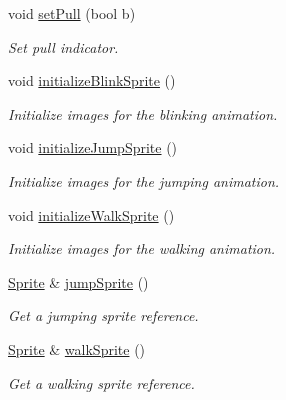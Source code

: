 \begin{DoxyCompactItemize}
void \hyperlink{class_player_adaf6df1aae76fe8d425a9691c373747b}{set\+Pull} (bool b)
\begin{DoxyCompactList}\small\item\em Set pull indicator. \end{DoxyCompactList}\item 
\mbox{\label{class_player_a27f69434c8c6a92087bb93c9a20e7bf8}} 
void \hyperlink{class_player_a27f69434c8c6a92087bb93c9a20e7bf8}{initialize\+Blink\+Sprite} ()
\begin{DoxyCompactList}\small\item\em Initialize images for the blinking animation. \end{DoxyCompactList}\item 
\mbox{\label{class_player_aed4b62c68567c76f38951c8f12095300}} 
void \hyperlink{class_player_aed4b62c68567c76f38951c8f12095300}{initialize\+Jump\+Sprite} ()
\begin{DoxyCompactList}\small\item\em Initialize images for the jumping animation. \end{DoxyCompactList}\item 
\mbox{\label{class_player_ac7b8410bd815605cd049c91784dcdb69}} 
void \hyperlink{class_player_ac7b8410bd815605cd049c91784dcdb69}{initialize\+Walk\+Sprite} ()
\begin{DoxyCompactList}\small\item\em Initialize images for the walking animation. \end{DoxyCompactList}\item 
\hyperlink{class_sprite}{Sprite} \& \hyperlink{class_player_a8dd19a1c1f7d541853bb4d676f9f1014}{jump\+Sprite} ()
\begin{DoxyCompactList}\small\item\em Get a jumping sprite reference. \end{DoxyCompactList}\item 
\hyperlink{class_sprite}{Sprite} \& \hyperlink{class_player_a03facc6ecd237a274e74516cca4b173d}{walk\+Sprite} ()
\begin{DoxyCompactList}\small\item\em Get a walking sprite reference. \end{DoxyCompactList}\item 
\mbox{\label{class_player_ab7370e82234a9a8b816a2c46214b9030}} 

\end{DoxyCompactItemize}
